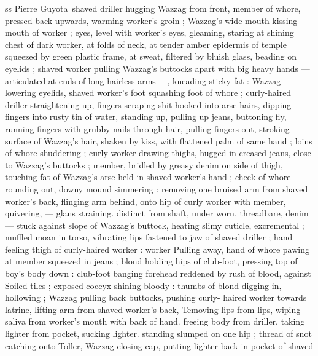 ss Pierre Guyota\
shaved driller hugging Wazzag from front, member of whore,
pressed back upwards, warming worker's groin ; Wazzag's wide
mouth kissing mouth of worker ; eyes, level with worker's eyes,
gleaming, staring at shining chest of dark worker, at folds of neck, at
tender amber epidermis of temple squeezed by green plastic frame,
at sweat, filtered by bluish glass, beading on eyelids ; shaved worker
pulling Wazzag's buttocks apart with big heavy hands — articulated
at ends of long hairless arms —, kneading sticky fat : Wazzag
lowering eyelids, shaved worker's foot squashing foot of whore ;
curly-haired driller straightening up, fingers scraping shit hooked
into arse-hairs, dipping fingers into rusty tin of water, standing up,
pulling up jeans, buttoning fly, running fingers with grubby nails
through hair, pulling fingers out, stroking surface of Wazzag's hair,
shaken by kiss, with flattened palm of same hand ; loins of whore
shuddering ; curly worker drawing thighs, hugged in creased jeans,
close to Wazzag's buttocks ; member, bridled by greasy denim on
side of thigh, touching fat of Wazzag’s arse held in shaved worker's
hand ; cheek of whore rounding out, downy mound simmering :
removing one bruised arm from shaved worker's back, flinging arm
behind, onto hip of curly worker with member, quivering, — glans
straining. distinct from shaft, under worn, threadbare, denim —
stuck against slope of Wazzag's buttock, heating slimy cuticle,
excremental ; muffled moan in torso, vibrating lips fastened to jaw of
shaved driller ; hand feeling thigh of curly-haired worker : worker
Pulling away, hand of whore pawing at member squeezed in jeans ;
blond holding hips of club-foot, pressing top of boy's body down :
club-foot banging forehead reddened by rush of blood, against
Soiled tiles ; exposed coccyx shining bloody : thumbs of blond
digging in, hollowing ; Wazzag pulling back buttocks, pushing curly-
haired worker towards latrine, lifting arm from shaved worker's back,
Temoving lips from lips, wiping saliva from worker's mouth with back
of hand. freeing body from driller, taking lighter from pocket, sucking
lighter. standing slumped on one hip ; thread of snot catching onto
Toller, Wazzag closing cap, putting lighter back in pocket of shaved

